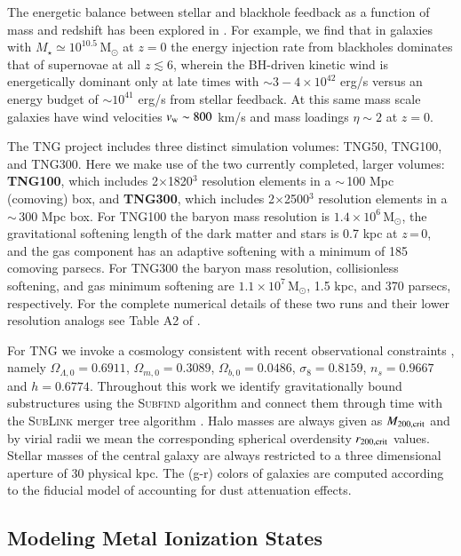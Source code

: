 \documentclass[useAMS,usenatbib]{mnras}
\newcommand{\msun}{\,M$_{\odot}$\xspace}
\newcommand{\gr}{\mbox{(g-r)}\xspace}
\begin{document}
The energetic balance between stellar and blackhole feedback as a function of mass and redshift has been explored in \cite{weinberger18}. For example, we find that in galaxies with $M_\star \simeq 10^{10.5}$\msun at $z=0$ the energy injection rate from blackholes dominates that of supernovae at all $z \lesssim 6$, wherein the BH-driven kinetic wind is energetically dominant only at late times with $\sim 3-4 \times 10^{42}$ erg/s versus an energy budget of $\sim 10^{41}$ erg/s from stellar feedback. At this same mass scale galaxies have wind velocities $v_{\rm w} \sim 800$ km/s and mass loadings $\eta \sim 2$ at $z=0$.

The TNG project includes three distinct simulation volumes: TNG50, TNG100, and TNG300. Here we make use of the two currently completed, larger volumes: \textbf{TNG100}, which includes 2$\times$1820$^3$ resolution elements in a $\sim$\,100 Mpc (comoving) box, and \textbf{TNG300}, which includes 2$\times$2500$^3$ resolution elements in a $\sim$\,300 Mpc box. For TNG100 the baryon mass resolution is $1.4 \times 10^6$\msun, the gravitational softening length of the dark matter and stars is 0.7 kpc at $z$\,=\,0, and the gas component has an adaptive softening with a minimum of 185 comoving parsecs. For TNG300 the baryon mass resolution, collisionless softening, and gas minimum softening are $1.1 \times 10^7$\msun, 1.5 kpc, and 370 parsecs, respectively. For the complete numerical details of these two runs and their lower resolution analogs see Table A2 of \cite{nelson18}. 

For TNG we invoke a cosmology consistent with recent observational constraints \citep{planck2015_xiii}, namely $\Omega_{\Lambda,0}=0.6911$, $\Omega_{m,0}=0.3089$, $\Omega_{b,0}=0.0486$, $\sigma_8=0.8159$, $n_s=0.9667$ and $h=0.6774$. Throughout this work we identify gravitationally bound substructures using the \textsc{Subfind} algorithm \citep{spr01} and connect them through time with the \textsc{SubLink} merger tree algorithm \citep{rodriguezgomez15}. Halo masses are always given as $M_{\rm 200,crit}$ and by virial radii we mean the corresponding spherical overdensity $r_{\rm 200,crit}$ values. Stellar masses of the central galaxy are always restricted to a three dimensional aperture of 30 physical kpc. The \gr colors of galaxies are computed according to the fiducial model of \cite{nelson18} accounting for dust attenuation effects.

\subsection{Modeling Metal Ionization States} \label{sec_ion_modeling}
\end{document}
